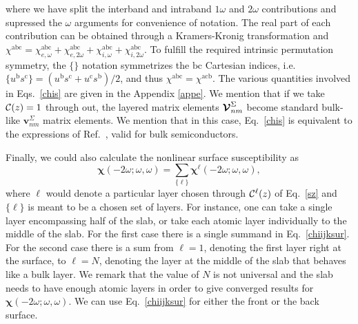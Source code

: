 \documentclass[floatfix,prb,aps,superscriptaddress,showpacs,11pt,preprint,letterpaper]{revtex4}
\begin{document}
where we have split the interband and intraband $1\omega$ and $2\omega$
contributions and supressed the $\omega$ arguments for 
convenience of notation.
The real part of each contribution can be obtained through
a Kramers-Kronig transformation\cite{nicolasPRB14} and
$\chi^{\mathrm{a}\mathrm{b}\mathrm{c}}=
\chi^{\mathrm{a}\mathrm{b}\mathrm{c}}_{e,\omega} 
+\chi^{\mathrm{a}\mathrm{b}\mathrm{c}}_{e,2\omega}
+\chi^{\mathrm{a}\mathrm{b}\mathrm{c}}_{i,\omega} 
+\chi^{\mathrm{a}\mathrm{b}\mathrm{c}}_{i,2\omega}
$.
To fulfill the required intrinsic permutation symmetry, %
the $\{\}$ notation symmetrizes the $\mathrm{b}\mathrm{c}$ Cartesian indices, i.e. 
$\{u^{\mathrm{b}}s^{\mathrm{c}}\}=(u^{\mathrm{b}}s^{\mathrm{c}}+u^{\mathrm{c}}s^{\mathrm{b}})/2$,
and thus
$\chi^{\mathrm{a}\mathrm{b}\mathrm{c}}=\chi^{\mathrm{a}\mathrm{c}\mathrm{b}}$.
The various quantities involved in Eqs.~\eqref{chis} are given in
the Appendix \ref{appe}. 
We mention that if we take ${\mathbf{\cal C}}(z)=1$ through out, the layered
matrix elements $\boldsymbol{\mathcal{\cal V}}^{\Sigma}_{nm}$ become standard bulk-like
$\mathbf{v}^{\Sigma}_{nm}$ matrix elements. We mention that in this
case, Eq.~\eqref{chis} is equivalent to the expressions of
Ref.~, valid for bulk semiconductors.
 
Finally, we could also calculate the nonlinear surface susceptibility as 
\begin{equation}\label{chiijksur}
\boldsymbol{\chi}(-2\omega;\omega,\omega)
= \sum_{\{\ell\}}\boldsymbol{\chi}^\ell(-2\omega;\omega,\omega),
\end{equation} 
where $\ell$ would denote a particular layer chosen through
${\mathbf{\cal C}}^\ell(z)$ of Eq.~\eqref{sz} and
$\{\ell\}$
is meant to be a chosen set of layers. For instance, 
one can take a single layer 
encompassing half of the slab, or take each 
atomic layer individually to the middle
of the slab. For the first case there is 
a single summand
in Eq.~\eqref{chiijksur}. For the second case
there is a sum from $\ell=1$, denoting the first layer 
right at the surface, to $\ell=N$, denoting the layer at the middle of the slab 
that behaves like a bulk layer.
We remark that the value of 
$N$ is not universal and
the slab needs to have enough atomic layers 
in order to give converged results for 
$\boldsymbol{\chi} (-2\omega;\omega,\omega)$. 
We can use Eq.~\eqref{chiijksur} for 
either the front or the back surface. 
\cite{mejiaRMF04}
\end{document}
